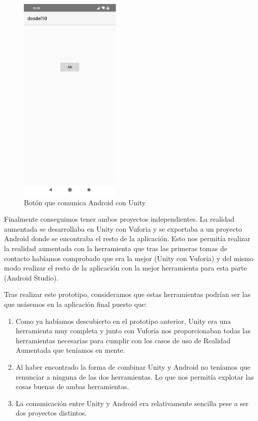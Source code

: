 \begin{figure}[H]
        \centering
        \includegraphics[height=4in]{figures/androidUnityVuforia.jpg}
        \caption{Botón que comunica Android con Unity}
\end{figure}

    Finalmente conseguimos tener ambos proyectos independientes. La realidad aumentada se desarrollaba en Unity con Vuforia y se exportaba a un proyecto Android donde se encontraba el resto de la aplicación.
    Esto nos permitía realizar la realidad aumentada con la herramienta que tras las primeras tomas de contacto habíamos comprobado que era la mejor (Unity con Vuforia) y del mismo modo realizar el resto de la aplicación con la mejor herramienta para esta parte (Android Studio).
\begin{flushleft}
    Tras realizar este prototipo, consideramos que estas herramientas podrían ser las que usásemos en la aplicación final puesto que:
    \begin{enumerate}
    \item Como ya habíamos descubierto en el prototipo anterior, Unity era una herramienta muy completa y junto con Vuforia nos proporcionaban todas las herramientas necesarias para cumplir con los casos de uso de Realidad Aumentada que teníamos en mente.
    \item Al haber encontrado la forma de combinar Unity y Android no teníamos que renunciar a ninguna de las dos herramientas. Lo que nos permitía explotar las cosas buenas de ambas herramientas.
    \item La comunicación entre Unity y Android era relativamente sencilla pese a ser dos proyectos distintos.
    \end{enumerate}
\end{flushleft}

